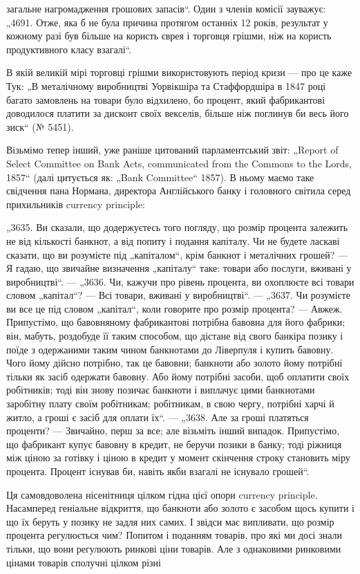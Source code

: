 \parcont{}  %
загальне нагромадження грошових запасів“. Один з членів комісії
зауважує: „4691. Отже, яка б не була причина протягом
останніх 12 років, результат у кожному разі був більше на користь єврея і торговця грішми, ніж на
користь продуктивного
класу взагалі“.

В якій великій мірі торговці грішми використовують період
кризи — про це каже Тук: „В металічному виробництві Уорвікшіра та Стаффордшіра в 1847 році багато
замовлень на товари
було відхилено, бо процент, який фабрикантові доводилося платити за дисконт своїх векселів, більше
ніж поглинув би весь
його зиск“ (№ 5451).

Візьмімо тепер інший, уже раніше цитований парламентський
звіт: „\textenglish{Report of Select Committee on Bank Acts, communicated from
the Commons to the Lords}, 1857“ (далі цитується як: „Bank Committee“ 1857). В ньому маємо таке
свідчення пана Нормана, директора Англійського банку і головного світила серед прихильників currency
principle:

„3635. Ви сказали, що додержуєтесь того погляду, що розмір
процента залежить не від кількості банкнот, а від попиту і подання капіталу. Чи не будете ласкаві
сказати, що ви розумієте під
„капіталом“, крім банкнот і металічних грошей? — Я гадаю, що звичайне визначення „капіталу“ таке:
товари або послуги, вживані
у виробництві“. — „3636. Чи, кажучи про рівень процента, ви
охоплюєте всі товари словом „капітал“? — Всі товари, вживані
у виробництві“. — „3637. Чи розумієте ви все це під словом
„капітал“, коли говорите про розмір процента? — Авжеж. Припустімо, що бавовняному фабрикантові
потрібна бавовна для його
фабрики; він, мабуть, роздобуде її таким способом, що дістане
від свого банкіра позику і поїде з одержаними таким чином
банкнотами до Ліверпуля і купить бавовну. Чого йому дійсно
потрібно, так це бавовни; банкноти або золото йому потрібні
тільки як засіб одержати бавовну. Або йому потрібні засоби,
щоб оплатити своїх робітників; тоді він знову позичає банкноти
і виплачує цими банкнотами заробітну плату своїм робітникам;
робітникам, в свою чергу, потрібні харчі й житло, а гроші є
засіб для оплати їх“. — „3638. Але за гроші платяться проценти? — Звичайно, перш за все; але
візьміть інший випадок. Припустімо, що фабрикант купує бавовну в кредит, не беручи позики
в банку; тоді ріжниця між ціною за готівку і ціною в кредит
у момент скінчення строку становить міру процента. Процент
існував би, навіть якби взагалі не існувало грошей“.

Ця самовдоволена нісенітниця цілком гідна цієї опори currency principle. Насамперед геніальне
відкриття, що банкноти
або золото є засобом щось купити і що їх беруть у позику не
задля них самих. І звідси має випливати, що розмір процента
регулюється чим? Попитом і поданням товарів, про які ми досі
знали тільки, що вони регулюють ринкові ціни товарів. Але
з однаковими ринковими цінами товарів сполучні цілком різні
\parbreak{}  %
